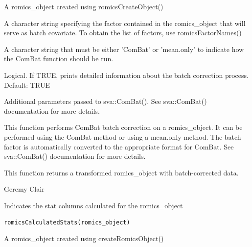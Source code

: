 \documentclass[a4paper]{book}
\begin{document}
\begin{Arguments}
\begin{ldescription}
\item[\code{romics\_object}] A romics\_object created using romicsCreateObject()

\item[\code{batch\_factor}] A character string specifying the factor contained in the romics\_object that will serve as batch covariate. To obtain the list of factors, use romicsFactorNames()

\item[\code{method}] A character string that must be either 'ComBat' or 'mean.only' to indicate how the ComBat function should be run.

\item[\code{verbose}] Logical. If TRUE, prints detailed information about the batch correction process. Default: TRUE

\item[\code{...}] Additional parameters passed to sva::ComBat(). See sva::ComBat() documentation for more details.
\end{ldescription}
\end{Arguments}
%
\begin{Details}
This function performs ComBat batch correction on a romics\_object. It can be performed using the ComBat method or using a mean.only method. The batch factor is automatically converted to the appropriate format for ComBat. See sva::ComBat() documentation for more details.
\end{Details}
%
\begin{Value}
This function returns a transformed romics\_object with batch-corrected data.
\end{Value}
%
\begin{Author}
Geremy Clair
\end{Author}
%
\begin{Description}
Indicates the stat columns calculated for the romics\_object
\end{Description}
%
\begin{Usage}
\begin{verbatim}
romicsCalculatedStats(romics_object)
\end{verbatim}
\end{Usage}
%
\begin{Arguments}
\begin{ldescription}
\item[\code{romics\_object}] A romics\_object created using createRomicsObject()
\end{ldescription}
\end{Arguments}
\end{document}
